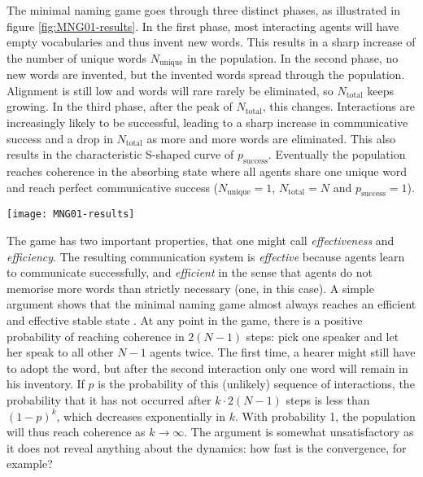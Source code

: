 \documentclass{../src/bcthesispart}
\begin{document}
The minimal naming game goes through three distinct phases, as illustrated in figure \ref{fig:MNG01-results}. 
In the first phase, most interacting agents will have empty vocabularies and thus invent new words. 
This results in a sharp increase of the number of unique words $N_{\text{unique}}$ in the population.
In the second phase, no new words are invented, but the invented words spread through the population.
Alignment is still low and words will rare rarely be eliminated, so $N_{\text{total}}$ keeps growing.
In the third phase, after the peak of $N_{\text{total}}$, this changes.
Interactions are increasingly likely to be successful, leading to a sharp increase in communicative success and a drop in $N_{\text{total}}$ as more and more words are eliminated.
This also results in the characteristic S-shaped curve of $p_{\text{success}}$.
Eventually the population reaches coherence in the absorbing state where all agents share one unique word and reach perfect communicative success ($N_{\text{unique}} = 1$, $N_{\text{total}} = N$ and $p_{\text{success}} = 1$).




\begin{SCfigure}
	\texttt{[image: MNG01-results]}
	
	\caption{
	The dynamics of the minimal naming game.
	An sharp transition leads to convergence and the emergence of consensus.
	\label{fig:MNG01-results}}
\end{SCfigure}



The game has two important properties, that one might call \emph{effectiveness} and \emph{efficiency}.
The resulting communication system is \emph{effective} because agents learn to communicate successfully, and \emph{efficient} in the sense that agents do not memorise more words than strictly necessary (one, in this case).
A simple argument shows that the minimal naming game almost always reaches an efficient and effective stable state \parencite{Baronchelli2006a}.
At any point in the game, there is a positive probability of reaching coherence in $2(N-1)$ steps: pick one speaker and let her speak to all other $N-1$ agents twice. 
The first time, a hearer might still have to adopt the word, but after the second interaction only one word will remain in his inventory.
If $p$ is the probability of this (unlikely) sequence of interactions, the probability that it has not occurred after $k \cdot 2(N-1)$ steps is less than $(1-p)^k$, which decreases exponentially in $k$.
With probability 1, the population will thus reach coherence as $k \to \infty$.
The argument is somewhat unsatisfactory as it does not reveal anything about the dynamics: how fast is the convergence, for example?
\end{document}
